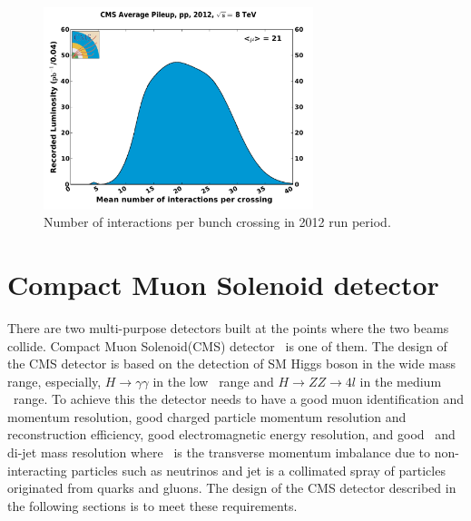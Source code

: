 %
\begin{figure}[ht!] 
\centering 
\includegraphics[width=0.7\textwidth]{figures/pileup_pp_2012.pdf}
\caption{Number of interactions per bunch crossing in 2012 run period.} 
\label{fig:pileup2012} 
\end{figure} 


\section{Compact Muon Solenoid detector} 


There are two multi-purpose detectors built at the points where 
the two beams collide. Compact Muon Solenoid(CMS) detector~\cite{cmstdr1} is one of them. 
The design of the CMS detector is based on the detection of SM Higgs boson
in the wide mass range, especially, $H \rightarrow \gamma\gamma$ in the low \mHi\ range 
and $H \rightarrow ZZ \rightarrow 4l$ in the medium \mHi\ range. 
To achieve this the detector needs to have a good muon identification and momentum resolution, 
good charged particle momentum resolution and reconstruction efficiency, 
good electromagnetic energy resolution, and good \met\ and di-jet mass resolution
where \met\ is the transverse momentum imbalance due to non-interacting particles 
such as neutrinos and jet is a collimated spray of particles originated from quarks and gluons. 
The design of the CMS detector described in the following sections 
is to meet these requirements. 

